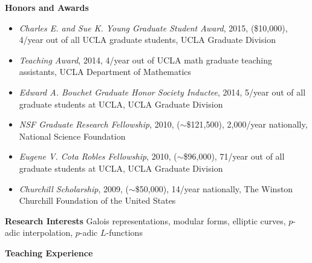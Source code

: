 \documentclass[10pt]{article}
\theoremstyle{plain} \numberwithin{equation}{section}
\theoremstyle{definition}
\begin{document}
\medskip

{\large\textbf{Honors and Awards}}
\begin{itemize}
    \item \textit{Charles E. and Sue K. Young Graduate Student Award}, 2015, (\$10,000), 4/year out of all UCLA graduate students, UCLA Graduate Division
    
    \item \textit{Teaching Award}, 2014, 4/year out of UCLA math graduate teaching assistants, UCLA Department of Mathematics

    \item \textit{Edward A. Bouchet Graduate Honor Society Inductee}, 2014, 5/year out of all graduate students at UCLA, UCLA Graduate Division
    
    \item \textit{NSF Graduate Research Fellowship}, 2010, ($\sim$\$121,500), 2,000/year nationally, National Science Foundation

    \item \textit{Eugene V. Cota Robles Fellowship}, 2010, ($\sim$\$96,000), 71/year out of all graduate students at UCLA, UCLA Graduate Division

    \item \textit{Churchill Scholarship}, 2009, ($\sim$\$50,000), 14/year nationally, The Winston Churchill Foundation of the United States
\end{itemize}

\medskip

{\large\textbf{Research Interests}} Galois representations, modular forms, elliptic curves, $p$-adic interpolation, $p$-adic $L$-functions

\pagebreak

{\large\textbf{Teaching Experience}}
\end{document}
